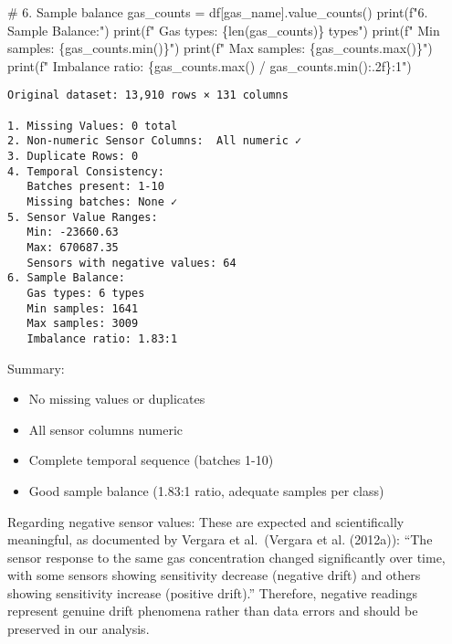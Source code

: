 \documentclass[
  letterpaper,
  DIV=11,
  numbers=noendperiod]{scrartcl}
\newenvironment{Shaded}{\begin{snugshade}}{\end{snugshade}}
\newcommand{\BuiltInTok}[1]{\textcolor[rgb]{0.00,0.23,0.31}{#1}}
\newcommand{\CommentTok}[1]{\textcolor[rgb]{0.37,0.37,0.37}{#1}}
\newcommand{\NormalTok}[1]{\textcolor[rgb]{0.00,0.23,0.31}{#1}}
\newcommand{\OperatorTok}[1]{\textcolor[rgb]{0.37,0.37,0.37}{#1}}
\newcommand{\SpecialCharTok}[1]{\textcolor[rgb]{0.37,0.37,0.37}{#1}}
\newcommand{\SpecialStringTok}[1]{\textcolor[rgb]{0.13,0.47,0.30}{#1}}
\newcommand{\StringTok}[1]{\textcolor[rgb]{0.13,0.47,0.30}{#1}}
\providecommand{\tightlist}{%
  \setlength{\itemsep}{0pt}\setlength{\parskip}{0pt}}
\renewenvironment{Shaded}{%
  \begin{tcolorbox}[%
    enhanced,%
    colback=codebg,%
    colframe=codebg,%
    borderline west={3pt}{0pt}{sectionblue},%
    fontupper=\small\ttfamily,%
    boxrule=0pt,%
    arc=0pt,%
    boxsep=5pt,%
    left=2mm,%
    right=2mm,%
    top=2mm,%
    bottom=2mm%
  ]%
}{%
  \end{tcolorbox}%
}
\begin{document}
\begin{Shaded}
\begin{Highlighting}[]
\CommentTok{\# 6. Sample balance}
\NormalTok{gas\_counts }\OperatorTok{=}\NormalTok{ df[}\StringTok{\textquotesingle{}gas\_name\textquotesingle{}}\NormalTok{].value\_counts()}
\BuiltInTok{print}\NormalTok{(}\SpecialStringTok{f"6. Sample Balance:"}\NormalTok{)}
\BuiltInTok{print}\NormalTok{(}\SpecialStringTok{f"   Gas types: }\SpecialCharTok{\{}\BuiltInTok{len}\NormalTok{(gas\_counts)}\SpecialCharTok{\}}\SpecialStringTok{ types"}\NormalTok{)}
\BuiltInTok{print}\NormalTok{(}\SpecialStringTok{f"   Min samples: }\SpecialCharTok{\{}\NormalTok{gas\_counts}\SpecialCharTok{.}\BuiltInTok{min}\NormalTok{()}\SpecialCharTok{\}}\SpecialStringTok{"}\NormalTok{)}
\BuiltInTok{print}\NormalTok{(}\SpecialStringTok{f"   Max samples: }\SpecialCharTok{\{}\NormalTok{gas\_counts}\SpecialCharTok{.}\BuiltInTok{max}\NormalTok{()}\SpecialCharTok{\}}\SpecialStringTok{"}\NormalTok{)}
\BuiltInTok{print}\NormalTok{(}\SpecialStringTok{f"   Imbalance ratio: }\SpecialCharTok{\{}\NormalTok{gas\_counts}\SpecialCharTok{.}\BuiltInTok{max}\NormalTok{() }\OperatorTok{/}\NormalTok{ gas\_counts}\SpecialCharTok{.}\BuiltInTok{min}\NormalTok{()}\SpecialCharTok{:.2f\}}\SpecialStringTok{:1"}\NormalTok{)}
\end{Highlighting}
\end{Shaded}

\begin{verbatim}
Original dataset: 13,910 rows × 131 columns

1. Missing Values: 0 total
2. Non-numeric Sensor Columns:  All numeric ✓
3. Duplicate Rows: 0
4. Temporal Consistency:
   Batches present: 1-10
   Missing batches: None ✓
5. Sensor Value Ranges:
   Min: -23660.63
   Max: 670687.35
   Sensors with negative values: 64
6. Sample Balance:
   Gas types: 6 types
   Min samples: 1641
   Max samples: 3009
   Imbalance ratio: 1.83:1
\end{verbatim}

Summary:

\begin{itemize}
\tightlist
\item
  No missing values or duplicates
\item
  All sensor columns numeric
\item
  Complete temporal sequence (batches 1-10)
\item
  Good sample balance (1.83:1 ratio, adequate samples per class)
\end{itemize}

Regarding negative sensor values: These are expected and scientifically
meaningful, as documented by Vergara et al.~(Vergara et al. (2012a)):
``The sensor response to the same gas concentration changed
significantly over time, with some sensors showing sensitivity decrease
(negative drift) and others showing sensitivity increase (positive
drift).'' Therefore, negative readings represent genuine drift phenomena
rather than data errors and should be preserved in our analysis.
\end{document}
